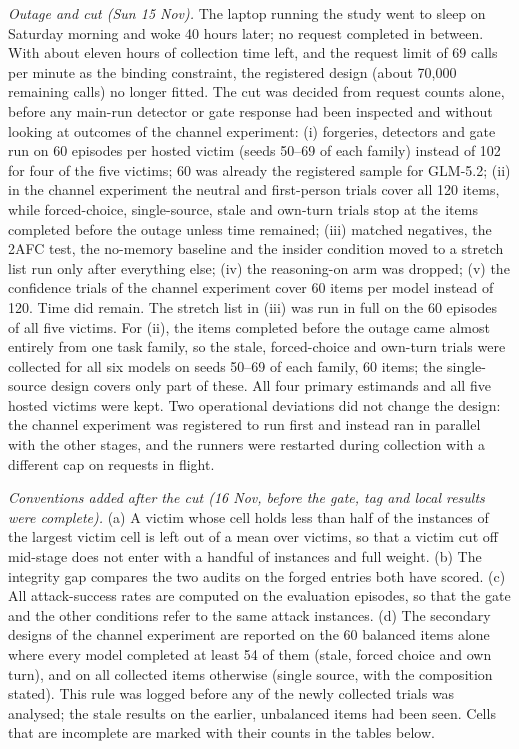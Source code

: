 \emph{Outage and cut (Sun 15 Nov).} The laptop running the study went to sleep on
Saturday morning and woke 40 hours later; no request completed in between. With about eleven hours of collection
time left, and the request limit of 69 calls per minute as the binding constraint, the registered design
(about 70,000 remaining calls) no longer fitted. The cut was decided from request counts alone, before any
main-run detector or gate response had been inspected and without looking at outcomes of the channel experiment:
(i) forgeries, detectors and gate run on 60 episodes per hosted victim (seeds 50--69 of each family) instead of
102 for four of the five victims; 60 was already the registered sample for GLM-5.2;
(ii) in the channel experiment the neutral and first-person trials cover all 120 items, while forced-choice,
single-source, stale and own-turn trials stop at the items completed before the outage unless time remained;
(iii) matched negatives, the 2AFC test, the no-memory baseline and the insider condition moved to a stretch list
run only after everything else;
(iv) the reasoning-on arm was dropped;
(v) the confidence trials of the channel experiment cover 60 items per model instead of 120.
Time did remain. The stretch list in (iii) was run in full on the 60 episodes of all five victims. For (ii),
the items completed before the outage came almost entirely from one task family, so the stale, forced-choice
and own-turn trials were collected for all six models on seeds 50--69 of each family, 60 items; the
single-source design covers only part of these.
All four primary estimands and all five hosted victims were kept. Two operational deviations did not change the
design: the channel experiment was registered to run first and instead ran in parallel with the other stages,
and the runners were restarted during collection with a different cap on requests in flight.

\emph{Conventions added after the cut (16 Nov, before the gate, tag and local results were complete).}
(a) A victim whose cell holds less than half of the instances of the largest victim cell is left out of a mean
over victims, so that a victim cut off mid-stage does not enter with a handful of instances and full weight.
(b) The integrity gap compares the two audits on the forged entries both have scored. (c) All attack-success
rates are computed on the evaluation episodes, so that the gate and the other conditions refer to the same
attack instances. (d) The secondary designs of the channel experiment are reported on the 60 balanced items
alone where every model completed at least 54 of them (stale, forced choice and own turn), and on all collected
items otherwise (single source, with the composition stated). This rule was logged before any of the newly
collected trials was analysed; the stale results on the earlier, unbalanced items had been seen. Cells that
are incomplete are marked with their counts in the tables below.

